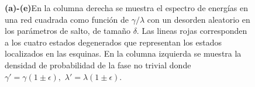 \begin{figure}[h!]
\begin{minipage}[h!]{0.7\textwidth}
\begin{subfigure}[b!]{0.56 \textwidth}
         \end{subfigure}\hspace*{-0.5em}
     \end{minipage}\vspace*{-0.5em}
    \caption{\textbf{(a)-(e)}En la columna derecha se muestra el espectro de energías en una red cuadrada como función de $\gamma/\lambda $ con un desorden aleatorio en los parámetros de salto, de tamaño $\delta$. Las lineas rojas corresponden a los cuatro estados degenerados que representan los estados localizados en las esquinas. En la columna izquierda se muestra la densidad de probabilidad de la fase no trivial donde $\gamma' = \gamma( 1 \pm \epsilon) ,\, \, \lambda' = \lambda( 1 \pm \epsilon)$.  }
    \label{fig:Pram_Proy_Delta_cuadrado}
\end{figure}